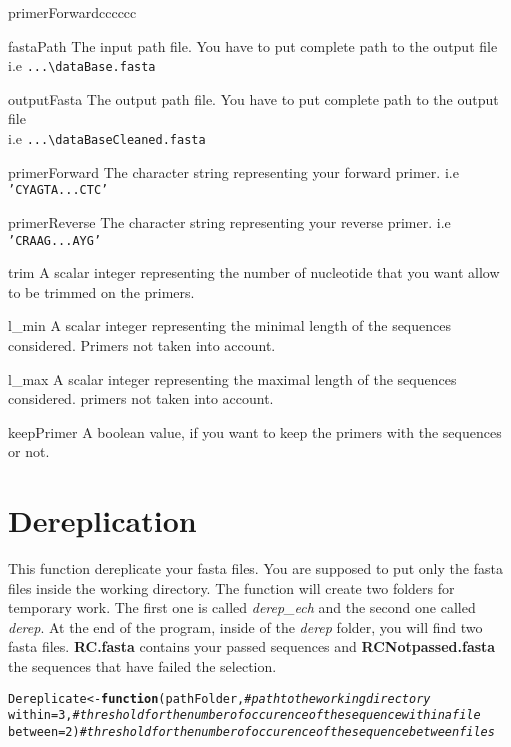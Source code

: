 \documentclass{article}\usepackage[]{graphicx}\usepackage[]{color}
\makeatletter
\newcommand{\hlcom}[1]{\textcolor[rgb]{0.678,0.584,0.686}{\textit{#1}}}%
\newcommand{\hlkwd}[1]{\textcolor[rgb]{0.737,0.353,0.396}{\textbf{#1}}}%
\newenvironment{kframe}{%
 \def\at@end@of@kframe{}%
 \ifinner\ifhmode%
  \def\at@end@of@kframe{\end{minipage}}%
  \begin{minipage}{\columnwidth}%
 \fi\fi%
 \def\FrameCommand##1{\hskip\@totalleftmargin \hskip-\fboxsep
 \colorbox{shadecolor}{##1}\hskip-\fboxsep
     \hskip-\linewidth \hskip-\@totalleftmargin \hskip\columnwidth}%
 \MakeFramed {\advance\hsize-\width
   \@totalleftmargin\z@ \linewidth\hsize
   \@setminipage}}%
 {\par\unskip\endMakeFramed%
 \at@end@of@kframe}
\newenvironment{knitrout}{}{} %
\makeatother
\begin{document}
\begin{labeling}{primerForwardcccccc}
	\item [fastaPath] The input path file. You have to put complete path to the output file\\ i.e \texttt{...\textbackslash dataBase.fasta}
	\item [outputFasta] The output path file. You have to put complete path to the output file\\ i.e \texttt{...\textbackslash dataBaseCleaned.fasta}
	\item [primerForward] The character string representing your forward primer. i.e \texttt{'CYAGTA...CTC'}
	\item [primerReverse] The character string representing your reverse primer. i.e \texttt{'CRAAG...AYG'}
	\item [trim] A scalar integer representing the number of nucleotide that you want allow to be trimmed on the primers.
	\item [l\_min] A scalar integer representing the minimal length of the sequences considered. Primers not taken into account.
	\item [l\_max] A scalar integer representing the maximal length of the sequences considered. primers not taken into account.
	\item [keepPrimer] A boolean value, if you want to keep the primers with the sequences or not.
\end{labeling}


\newpage
\section{Dereplication}

This function dereplicate your fasta files. You are supposed to put only the fasta files inside the working directory. The function will create two folders for temporary work. The first one is called \textit{derep\_ech} and the second one called \textit{derep}. At the end of the program, inside of the \textit{derep} folder, you will find two fasta files. \textbf{RC.fasta} contains your passed sequences and \textbf{RCNotpassed.fasta} the sequences that have failed the selection.

\begin{knitrout}
\color{fgcolor}\begin{kframe}
\begin{alltt}
Dereplicate <- \hlkwd{function}(pathFolder, \hlcom{# path to the working directory}
  within = 3, \hlcom{# threshold for the number of occurence of the sequence within a file}
  between = 2) \hlcom{# threshold for the number of occurence of the sequence between files}
\end{alltt}
\end{kframe}
\end{knitrout}

\newpage
\renewcommand\refname{References}
\end{document}
